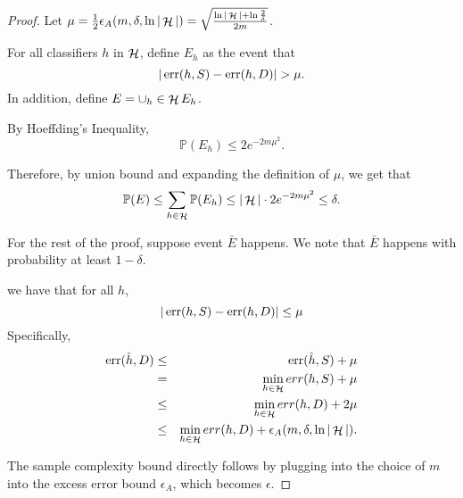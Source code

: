 \documentclass{article}
\DeclareMathOperator*{\err}{{\rm err}}
\DeclareMathOperator*{\Hcal}{{\cal H}}
\newcommand{\PP}{\mathbb{P}}
\begin{document}
\begin{proof}
Let $\mu = \frac{1}{2}\epsilon_A(m,\delta,\ln|\Hcal|) = \sqrt{\frac{\ln|\Hcal| + \ln\frac{2}{\delta}}{2m}}$.

For all classifiers $h$ in $\Hcal$, define $E_h$ as the event that
\[ |\err(h, S) - \err(h, D)| > \mu. \]
In addition, define $E = \cup_h \in \Hcal E_h$.

By Hoeffding's Inequality,
\[ \PP(E_h) \leq 2 e^{-2 m \mu^2}. \]

Therefore, by union bound and expanding the definition of $\mu$, we get that
\[ \PP(E) \leq \sum_{h \in \Hcal} \PP(E_h) \leq |\Hcal| \cdot 2 e^{-2 m \mu^2} \leq \delta. \]

For the rest of the proof, suppose event $\bar{E}$ happens. We note that $\bar{E}$ happens with probability at least $1-\delta$.

we have that for all $h$,
\[ |\err(h, S) - \err(h, D)| \leq \mu \]
Specifically,
\begin{eqnarray*}
  \err(\hat{h}, D)
  &\leq& \err(\hat{h}, S) + \mu \\
  &=& \min_{h \in \Hcal} err(h, S) + \mu \\
  &\leq& \min_{h \in \Hcal} err(h, D) + 2 \mu \\
  &\leq& \min_{h \in \Hcal} err(h, D) + \epsilon_A(m,\delta,\ln|\Hcal|).
\end{eqnarray*}

The sample complexity bound directly follows by plugging into the choice of $m$ into
the excess error bound $\epsilon_A$, which becomes $\epsilon$.

\end{proof}




\end{document}
